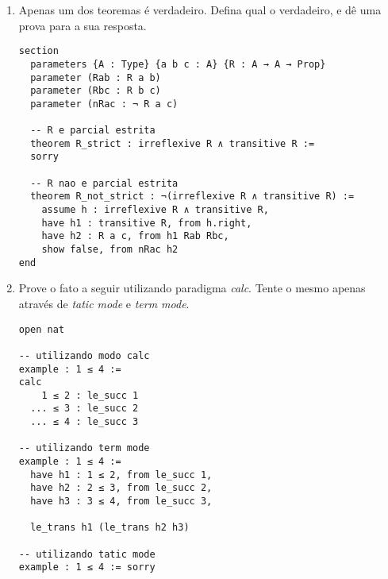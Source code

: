 \begin{enumerate}
\item Apenas um dos teoremas é verdadeiro. Defina qual o verdadeiro, e dê uma prova para a sua resposta.

\vspace{5mm}
\begin{lstlisting}
section
  parameters {A : Type} {a b c : A} {R : A → A → Prop}
  parameter (Rab : R a b)
  parameter (Rbc : R b c)
  parameter (nRac : ¬ R a c)

  -- R e parcial estrita
  theorem R_strict : irreflexive R ∧ transitive R :=
  sorry

  -- R nao e parcial estrita
  theorem R_not_strict : ¬(irreflexive R ∧ transitive R) :=
    assume h : irreflexive R ∧ transitive R,
    have h1 : transitive R, from h.right,
    have h2 : R a c, from h1 Rab Rbc,
    show false, from nRac h2
end
\end{lstlisting}
\vspace{5mm}

\item Prove o fato a seguir utilizando paradigma \textit{calc}. Tente o mesmo apenas através de \textit{tatic mode} e \textit{term mode}.

\vspace{5mm}
\begin{lstlisting}
open nat

-- utilizando modo calc
example : 1 ≤ 4 :=
calc
    1 ≤ 2 : le_succ 1
  ... ≤ 3 : le_succ 2
  ... ≤ 4 : le_succ 3

-- utilizando term mode
example : 1 ≤ 4 :=
  have h1 : 1 ≤ 2, from le_succ 1,
  have h2 : 2 ≤ 3, from le_succ 2,
  have h3 : 3 ≤ 4, from le_succ 3,

  le_trans h1 (le_trans h2 h3)

-- utilizando tatic mode
example : 1 ≤ 4 := sorry
\end{lstlisting}
\vspace{5mm}

\end{enumerate}
